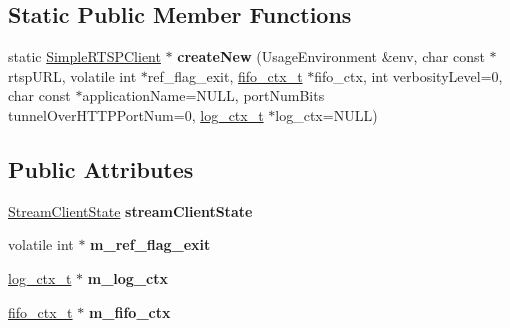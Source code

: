 \subsection*{Static Public Member Functions}
\begin{DoxyCompactItemize}
\item 
static \hyperlink{classSimpleRTSPClient}{Simple\+R\+T\+S\+P\+Client} $\ast$ {\bfseries create\+New} (Usage\+Environment \&env, char const $\ast$rtsp\+U\+RL, volatile int $\ast$ref\+\_\+flag\+\_\+exit, \hyperlink{structfifo__ctx__s}{fifo\+\_\+ctx\+\_\+t} $\ast$fifo\+\_\+ctx, int verbosity\+Level=0, char const $\ast$application\+Name=N\+U\+LL, port\+Num\+Bits tunnel\+Over\+H\+T\+T\+P\+Port\+Num=0, \hyperlink{structlog__ctx__s}{log\+\_\+ctx\+\_\+t} $\ast$log\+\_\+ctx=N\+U\+LL)\hypertarget{classSimpleRTSPClient_a8568e983f40d2992964ca3875b79b643}{}\label{classSimpleRTSPClient_a8568e983f40d2992964ca3875b79b643}

\end{DoxyCompactItemize}
\subsection*{Public Attributes}
\begin{DoxyCompactItemize}
\item 
\hyperlink{classStreamClientState}{Stream\+Client\+State} {\bfseries stream\+Client\+State}\hypertarget{classSimpleRTSPClient_a44482bf42e2aec10d383fed5d9e2d128}{}\label{classSimpleRTSPClient_a44482bf42e2aec10d383fed5d9e2d128}

\item 
volatile int $\ast$ {\bfseries m\+\_\+ref\+\_\+flag\+\_\+exit}\hypertarget{classSimpleRTSPClient_a40c26da532ddbc1d36c60688fc3cb35c}{}\label{classSimpleRTSPClient_a40c26da532ddbc1d36c60688fc3cb35c}

\item 
\hyperlink{structlog__ctx__s}{log\+\_\+ctx\+\_\+t} $\ast$ {\bfseries m\+\_\+log\+\_\+ctx}\hypertarget{classSimpleRTSPClient_afb0a7189511a5433a152136a3ec90cc7}{}\label{classSimpleRTSPClient_afb0a7189511a5433a152136a3ec90cc7}

\item 
\hyperlink{structfifo__ctx__s}{fifo\+\_\+ctx\+\_\+t} $\ast$ {\bfseries m\+\_\+fifo\+\_\+ctx}\hypertarget{classSimpleRTSPClient_abc2f811a9accfb7c6f50f3a240f33d09}{}\label{classSimpleRTSPClient_abc2f811a9accfb7c6f50f3a240f33d09}

\end{DoxyCompactItemize}
